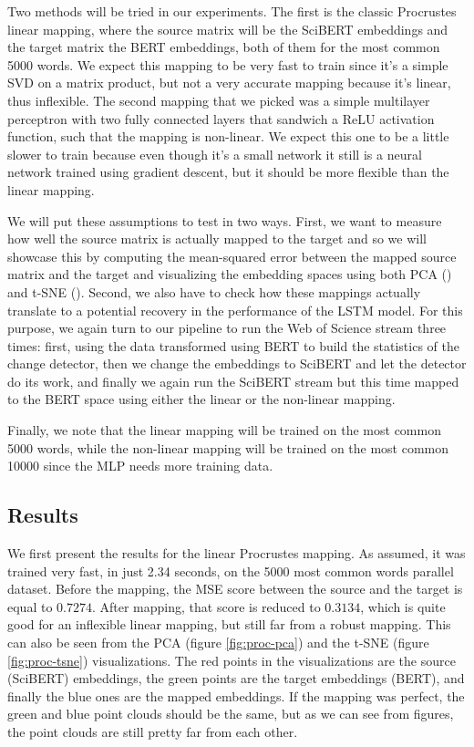 \documentclass[12pt]{extreport}
\begin{document}
Two methods will be tried in our experiments. The first is the classic Procrustes linear mapping, where the source matrix will be the SciBERT embeddings and the target matrix the BERT embeddings, both of them for the most common 5000 words. We expect this mapping to be very fast to train since it's a simple SVD on a matrix product, but not a very accurate mapping because it's linear, thus inflexible. The second mapping that we picked was a simple multilayer perceptron with two fully connected layers that sandwich a ReLU activation function, such that the mapping is non-linear. We expect this one to be a little slower to train because even though it's a small network it still is a neural network trained using gradient descent, but it should be more flexible than the linear mapping.

We will put these assumptions to test in two ways. First, we want to measure how well the source matrix is actually mapped to the target and so we will showcase this by computing the mean-squared error between the mapped source matrix and the target and visualizing the embedding spaces using both PCA (\cite{pca}) and t-SNE (\cite{tsne}). Second, we also have to check how these mappings actually translate to a potential recovery in the performance of the LSTM model. For this purpose, we again turn to our pipeline to run the Web of Science stream three times: first, using the data transformed using BERT to build the statistics of the change detector, then we change the embeddings to SciBERT and let the detector do its work, and finally we again run the SciBERT stream but this time mapped to the BERT space using either the linear or the non-linear mapping.

Finally, we note that the linear mapping will be trained on the most common 5000 words, while the non-linear mapping will be trained on the most common 10000 since the MLP needs more training data.

\subsection{Results}

We first present the results for the linear Procrustes mapping. As assumed, it was trained very fast, in just 2.34 seconds, on the 5000 most common words parallel dataset. Before the mapping, the MSE score between the source and the target is equal to $0.7274$. After mapping, that score is reduced to $0.3134$, which is quite good for an inflexible linear mapping, but still far from a robust mapping. This can also be seen from the PCA (figure \ref{fig:proc-pca}) and the t-SNE (figure \ref{fig:proc-tsne}) visualizations. The red points in the visualizations are the source (SciBERT) embeddings, the green points are the target embeddings (BERT), and finally the blue ones are the mapped embeddings. If the mapping was perfect, the green and blue point clouds should be the same, but as we can see from figures, the point clouds are still pretty far from each other.
\end{document}
